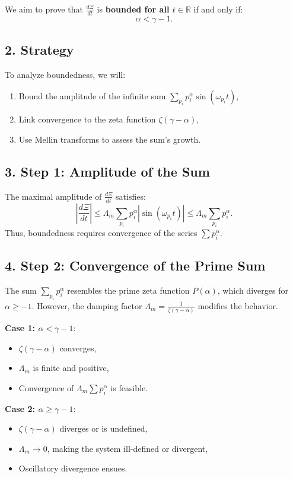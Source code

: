 \documentclass{article}
\theoremstyle{plain}
\theoremstyle{claimstyle}
\begin{document}
We aim to prove that \( \frac{d\Xi}{dt} \) is \textbf{bounded for all \( t \in \mathbb{R} \)} if and only if:
\[
\boxed{\alpha < \gamma - 1}.
\]

\subsection*{2. Strategy}

To analyze boundedness, we will:
\begin{enumerate}
    \item Bound the amplitude of the infinite sum \( \sum_{p_i} p_i^\alpha \sin(\omega_{p_i} t) \),
    \item Link convergence to the zeta function \( \zeta(\gamma - \alpha) \),
    \item Use Mellin transforms to assess the sum's growth.
\end{enumerate}

\subsection*{3. Step 1: Amplitude of the Sum}

The maximal amplitude of \( \frac{d\Xi}{dt} \) satisfies:
\[
\left| \frac{d\Xi}{dt} \right| \leq \Lambda_m \sum_{p_i} p_i^\alpha |\sin(\omega_{p_i} t)| \leq \Lambda_m \sum_{p_i} p_i^\alpha.
\]
Thus, boundedness requires convergence of the series \( \sum p_i^\alpha \).

\subsection*{4. Step 2: Convergence of the Prime Sum}

The sum \( \sum_{p_i} p_i^\alpha \) resembles the prime zeta function \( P(\alpha) \), which diverges for \( \alpha \geq -1 \). However, the damping factor \( \Lambda_m = \frac{1}{\zeta(\gamma - \alpha)} \) modifies the behavior.

\textbf{Case 1: \( \alpha < \gamma - 1 \)}:
\begin{itemize}
    \item \( \zeta(\gamma - \alpha) \) converges,
    \item \( \Lambda_m \) is finite and positive,
    \item Convergence of \( \Lambda_m \sum p_i^\alpha \) is feasible.
\end{itemize}

\textbf{Case 2: \( \alpha \geq \gamma - 1 \)}:
\begin{itemize}
    \item \( \zeta(\gamma - \alpha) \) diverges or is undefined,
    \item \( \Lambda_m \to 0 \), making the system ill-defined or divergent,
    \item Oscillatory divergence ensues.
\end{itemize}
\end{document}
